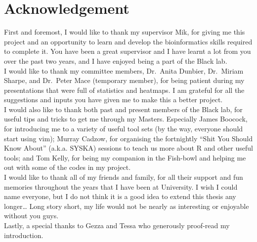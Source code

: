 
\vspace*{\fill}

\section*{\centering Acknowledgement}

First and foremost, I would like to thank my supervisor Mik, for giving me this project and an
opportunity to learn and develop the bioinformatics skills required to complete it.
You have been a great supervisor and I have learnt a lot from you over the past two years, and I have enjoyed being a part of the Black lab.
\\

\noindent
I would like to thank my committee members, Dr.\ Anita Dunbier, Dr.\ Miriam Sharpe, and Dr.\ Peter Mace (temporary member), for being patient during my presentations that were full of statistics and heatmaps.
I am grateful for all the suggestions and inputs you have given me to make this a better project.
\\

\noindent
I would also like to thank both past and present members of the Black lab, for useful tips and tricks to get me through my Masters.
Especially James Boocock, for introducing me to a variety of useful tool sets (by the way, everyone should start using vim); Murray Cadzow, for organising the fortnightly ``Shit You Should Know About'' (a.k.a. SYSKA) sessions to teach us more about R and other useful tools; and Tom Kelly, for being my companion in the Fish-bowl and helping me out with some of the codes in my project.
\\

\noindent
I would like to thank all of my friends and family, for all their support and fun memories throughout the years that I have been at University.
I wish I could name everyone, but I do not think it is a good idea to extend this thesis any longer\ldots
Long story short, my life would not be nearly as interesting or enjoyable without you guys.
\\

\noindent
Lastly, a special thanks to Gezza and Tessa who generously proof-read my introduction.
\\

\vfill

